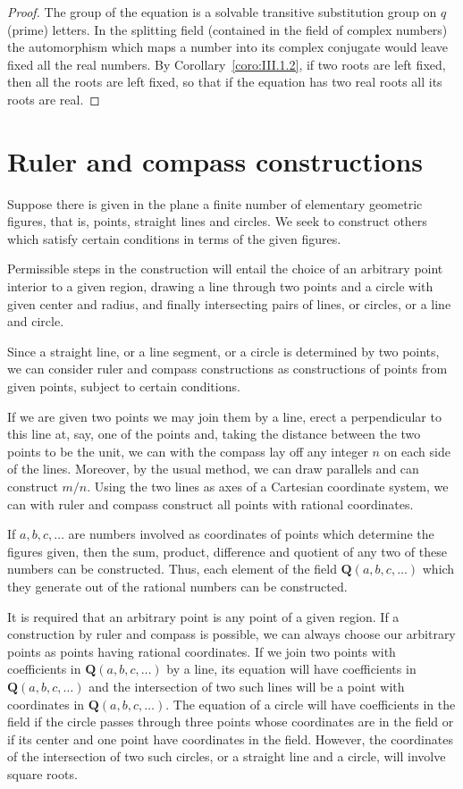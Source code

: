 \documentclass[10pt,leqno,a5paper]{book}
\theoremstyle{definition}
\def\QQ{\mathbf{Q}}
\let\htw\section
\begin{document}
\begin{proof}
The group of the equation is a solvable transitive substitution group on $q$ (prime) letters.
In the splitting field (contained in the field of complex numbers) the automorphism which maps a number into its complex conjugate would leave fixed all the real numbers.
By Corollary~\ref{coro:III.1.2}, if two roots are left fixed, then all the roots are left fixed, so that if the equation has two real roots all its roots are real.
\end{proof}


\htw{Ruler and compass constructions}


Suppose there is given in the plane a finite number of elementary geometric figures, that is, points, straight lines and circles.
We seek to construct others which satisfy certain conditions in terms of the given figures.

Permissible steps in the construction will entail the choice of an arbitrary point interior to a given region, drawing a line through two points and a circle with given center and radius, and finally intersecting pairs of lines, or circles, or a line and circle.

Since a straight line, or a line segment, or a circle is determined by two points, we can consider ruler and compass constructions as constructions of points from given points, subject to certain conditions.

If we are given two points we may join them by a line, erect a perpendicular to this line at, say, one of the points and, taking the distance between the two points to be the unit, we can with the compass lay off any integer $n$ on each side of the lines.
Moreover, by the usual method, we can draw parallels and can construct $m/n$.
Using the two lines as axes of a Cartesian coordinate system, we can with ruler and compass construct all points with rational coordinates.

If $a,b,c,\ldots$ are numbers involved as coordinates of points which determine the figures given, then the sum, product, difference and quotient of any two of these numbers can be constructed.
Thus, each element of the field $\QQ(a,b,c,\ldots)$ which they generate out of the rational numbers can be constructed.

It is required that an arbitrary point is any point of a given region.
If a construction by ruler and compass is possible, we can always choose our arbitrary points as points having rational coordinates.
If we join two points with coefficients in $\QQ(a,b,c,\ldots)$ by a line, its equation will have coefficients in $\QQ(a,b,c,\ldots)$ and the intersection of two such lines will be a point with coordinates in $\QQ(a,b,c,\ldots)$.
The equation of a circle will have coefficients in the field if the circle passes through three points whose coordinates are in the field or if its center and one point have coordinates in the field.
However, the coordinates of the intersection of two such circles, or a straight line and a circle, will involve square roots.
\end{document}
